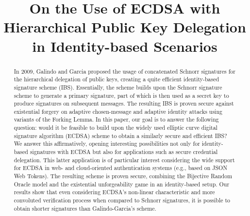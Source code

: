\documentclass[version=submission, floatrow]{iacrcc}
\title[
    running  = {On the Use of ECDSA with Hierarchical Public Key Delegation in IB Scenarios},
    plaintext = {On the use of ECDSA with hierarchical public key delegation in identity-based scenarios},
    subtitle = {}
]{On the Use of ECDSA with Hierarchical Public Key Delegation in Identity-based Scenarios}
\begin{document}
\maketitle


\begin{abstract}
In 2009, Galindo and Garcia proposed the usage of concatenated Schnorr signatures for the hierarchical delegation of public keys, creating a quite efficient identity-based signature scheme (IBS).
%
Essentially, the scheme builds upon the Schnorr signature scheme to generate a primary signature, part of which is then used as a secret key to produce signatures on subsequent messages.
%
The resulting IBS is proven secure against existential forgery on adaptive chosen-message and adaptive identity attacks using variants of the Forking Lemma. 
%
In this paper, our goal is to answer the following question: would it be feasible to build upon the widely used elliptic curve digital signature algorithm (ECDSA) scheme to obtain a similarly secure and efficient IBS?
%
We answer this affirmatively, opening interesting possibilities not only for identity-based signatures with ECDSA but also for applications such as secure credential delegation.
%
This latter application is of particular interest considering the wide support for ECDSA in web- and cloud-oriented authentication systems (e.g., based on JSON Web Tokens).
%
The resulting scheme is proven secure, combining the Bijective Random Oracle model and the existential unforgeability game in an identity-based setup. 
%
Our results show that even considering ECDSA's non-linear characteristic and more convoluted verification process when compared to Schnorr signatures, it is possible to obtain shorter signatures than Galindo-Garcia's scheme.

\end{abstract}
\end{document}

